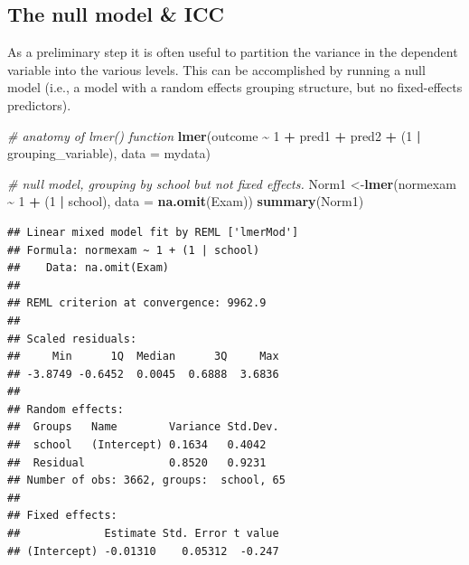 \documentclass[
]{book}
\newenvironment{Shaded}{\begin{snugshade}}{\end{snugshade}}
\newcommand{\CommentTok}[1]{\textcolor[rgb]{0.56,0.35,0.01}{\textit{#1}}}
\newcommand{\DataTypeTok}[1]{\textcolor[rgb]{0.13,0.29,0.53}{#1}}
\newcommand{\DecValTok}[1]{\textcolor[rgb]{0.00,0.00,0.81}{#1}}
\newcommand{\KeywordTok}[1]{\textcolor[rgb]{0.13,0.29,0.53}{\textbf{#1}}}
\newcommand{\NormalTok}[1]{#1}
\newcommand{\OperatorTok}[1]{\textcolor[rgb]{0.81,0.36,0.00}{\textbf{#1}}}
\newcommand{\StringTok}[1]{\textcolor[rgb]{0.31,0.60,0.02}{#1}}
\begin{document}
\hypertarget{the-null-model-icc}{%
\subsection{The null model \& ICC}\label{the-null-model-icc}}

As a preliminary step it is often useful to partition the variance in the dependent variable into the various levels. This can be accomplished by running a null model (i.e., a model with a random effects grouping structure, but no fixed-effects predictors).

\begin{Shaded}
\begin{Highlighting}[]
  \CommentTok{\# anatomy of lmer() function}
  \KeywordTok{lmer}\NormalTok{(outcome }\OperatorTok{\textasciitilde{}}\StringTok{ }\DecValTok{1} \OperatorTok{+}\StringTok{ }\NormalTok{pred1 }\OperatorTok{+}\StringTok{ }\NormalTok{pred2 }\OperatorTok{+}\StringTok{ }\NormalTok{(}\DecValTok{1} \OperatorTok{|}\StringTok{ }\NormalTok{grouping\_variable), }
       \DataTypeTok{data =}\NormalTok{ mydata)}
\end{Highlighting}
\end{Shaded}

\begin{Shaded}
\begin{Highlighting}[]
  \CommentTok{\# null model, grouping by school but not fixed effects.}
\NormalTok{  Norm1 \textless{}{-}}\KeywordTok{lmer}\NormalTok{(normexam }\OperatorTok{\textasciitilde{}}\StringTok{ }\DecValTok{1} \OperatorTok{+}\StringTok{ }\NormalTok{(}\DecValTok{1} \OperatorTok{|}\StringTok{ }\NormalTok{school), }
              \DataTypeTok{data =} \KeywordTok{na.omit}\NormalTok{(Exam))}
  \KeywordTok{summary}\NormalTok{(Norm1)}
\end{Highlighting}
\end{Shaded}

\begin{verbatim}
## Linear mixed model fit by REML ['lmerMod']
## Formula: normexam ~ 1 + (1 | school)
##    Data: na.omit(Exam)
## 
## REML criterion at convergence: 9962.9
## 
## Scaled residuals: 
##     Min      1Q  Median      3Q     Max 
## -3.8749 -0.6452  0.0045  0.6888  3.6836 
## 
## Random effects:
##  Groups   Name        Variance Std.Dev.
##  school   (Intercept) 0.1634   0.4042  
##  Residual             0.8520   0.9231  
## Number of obs: 3662, groups:  school, 65
## 
## Fixed effects:
##             Estimate Std. Error t value
## (Intercept) -0.01310    0.05312  -0.247
\end{verbatim}
\end{document}

